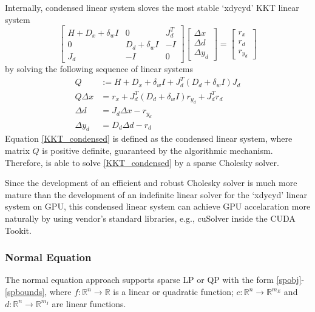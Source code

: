 Internally, condensed linear system sloves the most stable `xdycyd' KKT linear system 
\begin{equation} \label{KKT_xdycyd_condensed}
  \begin{bmatrix} 
  H+D_x+\delta_{w}I & 0  & J_d^T\\
  0  & D_d + \delta_{w}I &  -I\\
  J_d & -I & 0 
  \end{bmatrix}
  \begin{bmatrix} \Delta x \\ \Delta d \\ \Delta y_d  \end{bmatrix} = 
  \begin{bmatrix} r_x \\ r_d \\ r_{y_d}\end{bmatrix} 
\end{equation}
by solving the following sequence of linear systems
\begin{align}
  Q & := H+D_x+\delta_wI + J_d^T(D_d+\delta_w I)J_d   \\
  Q\Delta x & = r_x + J_d^T(D_d+\delta_w I)r_{y_d} + J_d^T r_d \label{KKT_condensed} \\
  \Delta d & = J_d \Delta x- r_{y_d} \\
  \Delta y_d   & = D_d \Delta d - r_d 
\end{align}
Equation \eqref{KKT_condensed} is defined as the condensed linear system, where matrix $Q$ is positive definite, guaranteed by the algorithmic mechanism. Therefore, \Hi is able to solve \eqref{KKT_condensed} by a sparse Cholesky solver. 

Since the development of an efficient and robust Cholesky solver is much more mature than the development of an indefinite linear solver for the `xdycyd' linear system on GPU, this condensed linear system can achieve GPU accelaration more naturally by using vendor's standard libraries, e.g., cuSolver inside the CUDA Tookit.



\subsubsection{Normal Equation}

The normal equation approach supports sparse LP or QP with the form \eqref{spobj}-\eqref{spbounds}, where $f:\mathbb{R}^n\rightarrow\mathbb{R}$ is a linear or quadratic function; $c:\mathbb{R}^n\rightarrow\mathbb{R}^{m_E}$ and $d:\mathbb{R}^n\rightarrow\mathbb{R}^{m_I}$ are linear functions.

